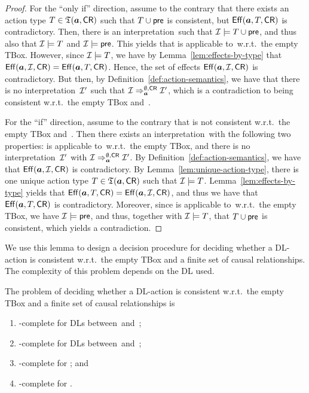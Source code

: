 \begin{proof}
    For the \enquote{only if} direction, assume to the contrary that there
    exists an action type $T\in\mathfrak{T}(\boldsymbol a,\mathsf{CR})$ such that $T\cup\mathsf{pre}$ is
    consistent, but $\operatorname{\mathsf{Eff}}(\boldsymbol a,T,\mathsf{CR})$ is contradictory.  Then, there is an
    interpretation~\Imc such that $\mathcal{I}\models T\cup\mathsf{pre}$, and thus also that
    $\mathcal{I}\models T$ and $\mathcal{I}\models\mathsf{pre}$.  This yields that \abf is applicable
    to~\Imc w.r.t.\ the empty TBox.  However, since $\mathcal{I}\models T$, we have by
    Lemma~\ref{lem:effects-by-type} that $\operatorname{\mathsf{Eff}}(\boldsymbol a,\mathcal{I},\mathsf{CR})=\operatorname{\mathsf{Eff}}(\boldsymbol a,T,\mathsf{CR})$.
    Hence, the set of effects $\operatorname{\mathsf{Eff}}(\boldsymbol a,\mathcal{I},\mathsf{CR})$ is contradictory.  But then,
    by Definition~\ref{def:action-semantics}, we have that there is no
    interpretation~$\mathcal{I}'$ such that
    $\mathcal{I}\Rightarrow_{\boldsymbol a}^{\emptyset,\mathsf{CR}}\mathcal{I}'$, which is a contradiction to
    \abf being consistent w.r.t.\ the empty TBox and~\CR.

    For the \enquote{if} direction, assume to the contrary that \abf is not
    consistent w.r.t.\ the empty TBox and~\CR.  Then there exists an
    interpretation~\Imc with the following two properties: \abf is applicable
    to~\Imc w.r.t.\ the empty TBox, and there is no interpretation~$\mathcal{I}'$ with
    $\mathcal{I}\Rightarrow_{\boldsymbol a}^{\emptyset,\mathsf{CR}}\mathcal{I}'$.  By
    Definition~\ref{def:action-semantics}, we have that $\operatorname{\mathsf{Eff}}(\boldsymbol a,\mathcal{I},\mathsf{CR})$ is
    contradictory.  By Lemma~\ref{lem:unique-action-type}, there is one unique
    action type $T\in\mathfrak{T}(\boldsymbol a,\mathsf{CR})$ such that $\mathcal{I}\models T$.
    Lemma~\ref{lem:effects-by-type} yields that
    $\operatorname{\mathsf{Eff}}(\boldsymbol a,T,\mathsf{CR})=\operatorname{\mathsf{Eff}}(\boldsymbol a,\mathcal{I},\mathsf{CR})$, and thus we have that
    $\operatorname{\mathsf{Eff}}(\boldsymbol a,T,\mathsf{CR})$ is contradictory.  Moreover, since \abf is applicable
    to~\Imc w.r.t.\ the empty TBox, we have $\mathcal{I}\models\mathsf{pre}$, and thus,
    together with $\mathcal{I}\models T$, that $T\cup\mathsf{pre}$ is consistent, which yields
    a contradiction.
\end{proof}

\noindent
We use this lemma to design a decision procedure for deciding whether a
DL-action is consistent w.r.t.\ the empty TBox and a finite set of causal
relationships.  The complexity of this problem depends on the DL used.

\begin{theorem}\label{thm:complexity-consistency-no-tbox}
    The problem of deciding whether a DL-action is consistent w.r.t.\ the empty
    TBox and a finite set of causal relationships is
    \begin{enumerate}
        \item\label{enum:part-alcqo}
            \PSpace-complete for DLs between~\ALC and~\ALCQO;
        \item\label{enum:part-alcqi}
            \PSpace-complete for DLs between~\ALC and~\ALCQI;
        \item\label{enum:part-alcio}
            \ExpTime-complete for \ALCIO; and
        \item\label{enum:part-alcqio}
            \coNExpTime-complete for \ALCQIO.
    \end{enumerate}
\end{theorem}

